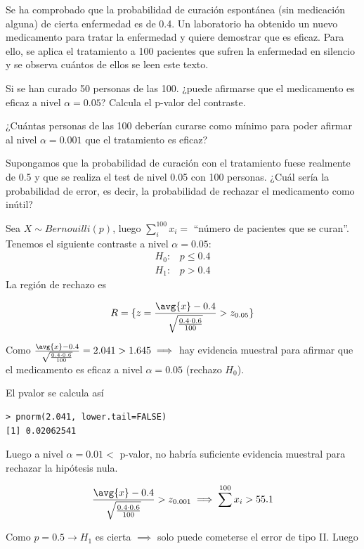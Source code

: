 \begin{problem}[7]
Se ha comprobado que la probabilidad de curación espontánea (sin medicación alguna) de cierta enfermedad es de 0.4. Un laboratorio ha obtenido un nuevo medicamento para tratar la enfermedad y quiere demostrar que es eficaz. Para ello, se aplica el tratamiento a 100 pacientes que sufren la enfermedad en silencio y se observa cuántos de ellos se leen este texto.

\ppart Si se han curado 50 personas de las 100. ¿puede afirmarse que el medicamento es eficaz a nivel $\alpha = 0.05$? Calcula el p-valor del contraste.

\ppart ¿Cuántas personas de las 100 deberían curarse como mínimo para poder afirmar al nivel $\alpha = 0.001$ que el tratamiento es eficaz?

\ppart Supongamos que la probabilidad de curación con el tratamiento fuese realmente de 0.5 y que se realiza el test de nivel 0.05 con 100 personas. ¿Cuál sería la probabilidad de error, es decir, la probabilidad de rechazar el medicamento como inútil?

\solution
\spart
Sea $X \sim Bernouilli(p)$, luego $\sum\limits^{100}_i x_i = $ ``número de pacientes que se curan''. Tenemos el siguiente contraste a nivel $\alpha = 0.05$:
\begin{gather*}
H_0 : \;\;\; p \leq 0.4\\
H_1 : \;\;\; p > 0.4
\end{gather*}
La región de rechazo es

\[ R = \{ z = \frac{\avg{x} - 0.4}{\sqrt{\frac{0.4 \cdot 0.6}{100}}} > z_{0.05} \} \]

Como $\frac{\avg{x} - 0.4}{\sqrt{\frac{0.4 \cdot 0.6}{100}}} = 2.041 > 1.645 \implies$ hay evidencia muestral para afirmar que el medicamento es eficaz a nivel $\alpha = 0.05$ (rechazo $H_0$).

El pvalor se calcula así
\begin{verbatim}
> pnorm(2.041, lower.tail=FALSE)
[1] 0.02062541
\end{verbatim} 
Luego a nivel $\alpha = 0.01 < $ p-valor, no habría suficiente evidencia muestral para rechazar la hipótesis nula.

\spart
\[
\frac{\avg{x} - 0.4}{\sqrt{\frac{0.4 \cdot 0.6}{100}}} > z_{0.001}
\implies \sum\limits^{100} x_i > 55.1
\]

\spart
Como $p = 0.5 \rightarrow H_1$ es cierta $\implies$ solo puede cometerse el error de tipo II. Luego


\end{problem}
